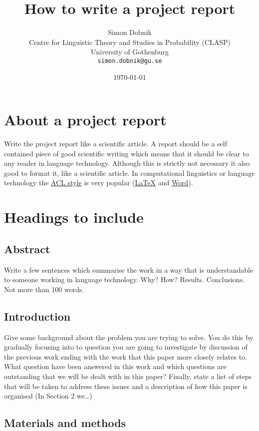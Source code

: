 \documentclass[a4paper,11pt]{article}
\title{\textbf{How to write a project report}}
\date{\normalsize \today}
\author{\normalsize Simon Dobnik\\
       \normalsize Centre for Linguistic Theory and Studies in Probability (CLASP) \\
       \normalsize University of Gothenburg \\
       \normalsize \texttt{simon.dobnik@gu.se}
}
\begin{document}
\maketitle

\section{About a project report}\label{how-to-write-a-project-report}

Write the project report like a scientific article. A report should be a
self contained piece of good scientific writing which means that it
should be clear to any reader in language technology. Although this is
strictly not necessary it also good to format it, like a scientific
article. In computational linguistics or language technology the
\href{http://acl2017.org/calls/papers/}{ACL style} is very popular
(\href{http://acl2017.org/downloads/acl17-latex.zip}{LaTeX} and
\href{http://acl2017.org/downloads/acl17-word.zip}{Word}).


\section{Headings to include}

\subsection{Abstract}\label{abstract}

Write a few sentences which summarise the work in a way that is
understandable to someone working in language technology. Why? How?
Results. Conclusions. Not more than 100 words.

\subsection{Introduction}\label{introduction}

Give some background about the problem you are trying to solve. You do
this by gradually focusing into to question you are going to investigate
by discussion of the previous work ending with the work that this paper
more closely relates to. What question have been answered in this work
and which questions are outstanding that we will be dealt with in this
paper? Finally, state a list of steps that will be taken to address
these issues and a description of how this paper is organised (In
Section 2 we\ldots{})

\subsection{Materials and methods}\label{materials-and-methods}
\end{document}
